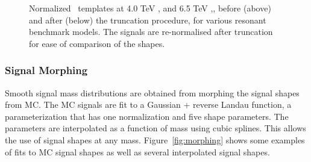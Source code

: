 \begin{figure}[!htb]
\caption{Normalized \mjj\ templates at 4.0 TeV , and 6.5 TeV ,, before (above) and after (below) the truncation procedure, for various resonant benchmark models. The signals are re-normalised after truncation for ease of comparison of the shapes.}
\label{fig:resonance_templates_shapes}
\end{figure}


\clearpage
\subsubsection{Signal Morphing}
\label{sec:SwiftMorphing}


Smooth signal mass distributions are obtained  from morphing the signal shapes from MC. The MC signals are fit to a Gaussian + reverse Landau function, a parameterization that has one normalization and five shape parameters. The parameters are interpolated as a function of mass using cubic splines. This allows the use of signal shapes at any mass. Figure~\ref{fig:morphing} shows some examples of fits to MC signal shapes as well as several interpolated signal shapes.  

